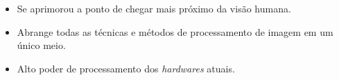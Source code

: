 \begin{itemize}

\item Se aprimorou a ponto de chegar mais próximo da visão humana.

\item Abrange todas as técnicas e métodos de processamento de imagem em um único meio.

\item Alto poder de processamento dos \textit{hardwares} atuais.

\end{itemize}